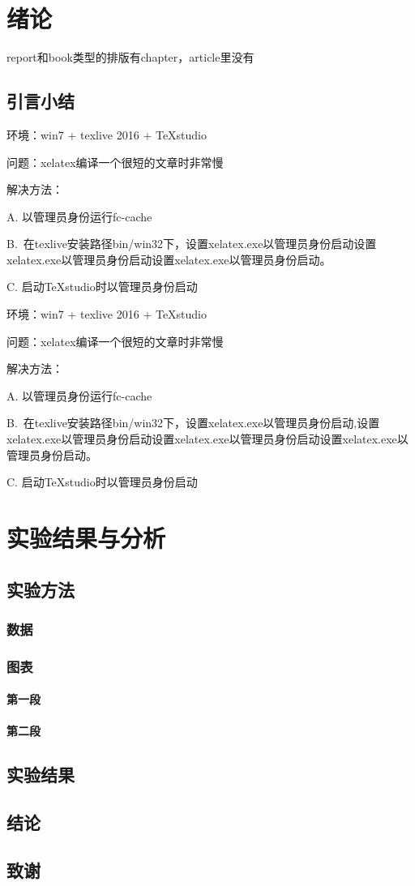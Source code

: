 \documentclass{ctexbook} %
\begin{document}
	\tableofcontents
	
	\chapter{绪论}report和book类型的排版有chapter，article里没有
	\section{引言小结} %
	环境：win7 + texlive 2016 + TeXstudio
	
	问题：xelatex编译一个很短的文章时非常慢
	
	解决方法：
	
	A. 以管理员身份运行fc-cache
	
	B. 在texlive安装路径bin/win32下，设置xelatex.exe以管理员身份启动设置xelatex.exe以管理员身份启动设置xelatex.exe以管理员身份启动。

	C. 启动TeXstudio时以管理员身份启动
	
	环境：win7 + texlive 2016 + TeXstudio
	
	问题：xelatex编译一个很短的文章时非常慢
	
	解决方法：
	
	A. 以管理员身份运行fc-cache
	
	B. 在texlive安装路径bin/win32下，设置xelatex.exe以管理员身份启动,设置xelatex.exe以管理员身份启动设置xelatex.exe以管理员身份启动设置xelatex.exe以管理员身份启动。
	
	C. 启动TeXstudio时以管理员身份启动
	\chapter{实验结果与分析}  %
	\section{实验方法}
	\subsection{数据}
	\subsection{图表}
	\subsubsection{第一段}
	\subsubsection{第二段}
	\section{实验结果}
	\section{结论}
	\section{致谢}
\end{document}
